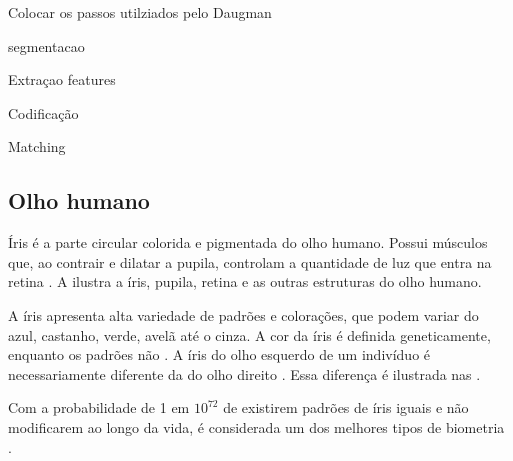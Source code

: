 \par Colocar os passos utilziados pelo Daugman \cite{daugman2004}

\par segmentacao

\par Extraçao features

\par Codificação

\par Matching

\subsection{Olho humano}\label{sec:iris:olho}

\par Íris é a parte circular colorida e pigmentada do olho humano. Possui músculos que, ao contrair e dilatar a pupila, controlam a quantidade de luz que entra na retina \cite{adlerIris2003}. A  ilustra a íris, pupila, retina e as outras estruturas do olho humano.

%

\par A íris apresenta alta variedade de padrões e colorações, que podem variar do azul, castanho, verde, avelã até o cinza. A cor da íris é definida geneticamente, enquanto os padrões não \cite{adlerIris2003}. A íris do olho esquerdo de um indivíduo é necessariamente diferente da do olho direito \cite{wayman2005biometric}. Essa diferença é ilustrada nas .

\par Com a probabilidade de 1 em $10^{72}$ de existirem padrões de íris iguais e não modificarem ao longo da vida, é considerada um dos melhores tipos de biometria \cite{iris_UFRJ}.



